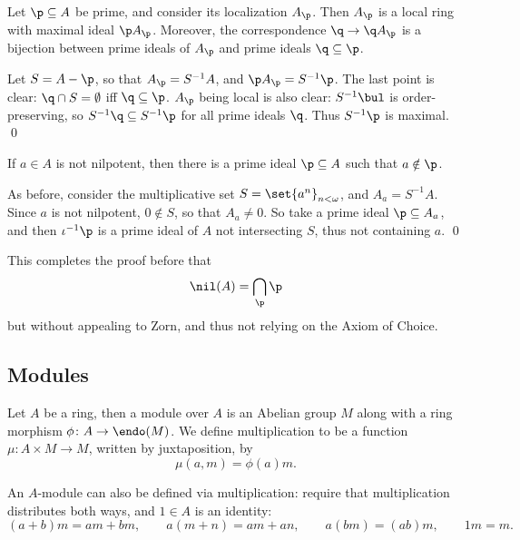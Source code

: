 \eproof

\bcoro

    Let $\p\subseteq A$ be prime, and consider its localization $A_\p$.
    Then $A_\p$ is a local ring with maximal ideal $\p A_\p$.
    Moreover, the correspondence $\q\to\q A_\p$ is a bijection between prime ideals of $A_\p$ and prime ideals $\q\subseteq\p$.

\ecoro

\bproof

    Let $S=A-\p$, so that $A_\p=S^{-1}A$, and $\p A_\p=S^{-1}\p$.
    The last point is clear: $\q\cap S=\emptyset$ iff $\q\subseteq\p$.
    $A_\p$ being local is also clear: $S^{-1}\bul$ is order-preserving, so $S^{-1}\q\subseteq S^{-1}\p$ for all prime ideals $\q$.
    Thus $S^{-1}\p$ is maximal.
    \qed

\eproof

\bcoro

    If $a\in A$ is not nilpotent, then there is a prime ideal $\p\subseteq A$ such that $a\notin\p$.

\ecoro

\bproof

    As before, consider the multiplicative set $S=\set{a^n}_{n<\omega}$, and $A_a=S^{-1}A$.
    Since $a$ is not nilpotent, $0\notin S$, so that $A_a\neq0$.
    So take a prime ideal $\p\subseteq A_a$, and then $\iota^{-1}\p$ is a prime ideal of $A$ not intersecting $S$, thus not containing $a$.
    \qed

\eproof

\bnote

    This completes the proof before that
    $$ \nil(A) = \bigcap_\p\p $$
    but without appealing to Zorn, and thus not relying on the Axiom of Choice.

\enote

\subsection{Modules}

\bdefn

    Let $A$ be a ring, then a {\emphcolor module} over $A$ is an Abelian group $M$ along with a ring morphism
    $\phi\colon A\to\endo(M)$.
    We define {\emphcolor multiplication} to be a function $\mu\colon A\times M\to M$, written by juxtaposition, by
    $$ \mu(a,m) = \phi(a)m . $$

\edefn

An $A$-module can also be defined via multiplication: require that multiplication distributes both ways, and $1\in A$ is an identity:
$$ (a+b)m = am + bm,\qquad a(m+n) = am + an,\qquad a(bm) = (ab)m,\qquad 1m = m . $$

